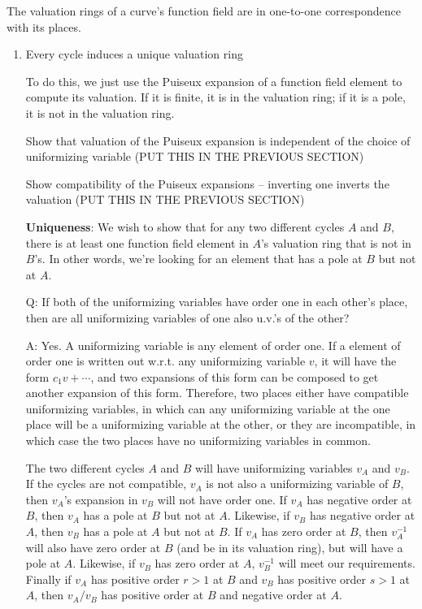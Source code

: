 
\begin{theorem}
The valuation rings of a curve's function field are in one-to-one correspondence with its places.

\proof
\begin{enumerate}
\item Every cycle induces a unique valuation ring

To do this, we just use the Puiseux expansion of a function field element to compute its valuation.
If it is finite, it is in the valuation ring; if it is a pole, it is not in the valuation ring.

Show that valuation of the Puiseux expansion is independent of the choice of uniformizing variable
(PUT THIS IN THE PREVIOUS SECTION)

Show compatibility of the Puiseux expansions -- inverting one inverts the valuation
(PUT THIS IN THE PREVIOUS SECTION)

{\bf Uniqueness}: We wish to show that for any two different cycles $A$ and $B$,
there is at least one function field element in $A$'s valuation ring that is not in $B$'s.
In other words, we're looking for an element that has a pole at $B$ but not at $A$.

Q: If both of the uniformizing variables have order one in each other's place,
then are all uniformizing variables of one also u.v.'s of the other?

A: Yes.  A uniformizing variable is any element of order one.  If a element of
order one is written out w.r.t. any uniformizing variable $v$, it will have
the form $c_1 v + \cdots$, and two expansions of this form can be composed
to get another expansion of this form.  Therefore, two places either have
compatible uniformizing variables, in which can any uniformizing variable
at the one place will be a uniformizing variable at the other, or they
are incompatible, in which case the two places have no uniformizing
variables in common.

The two different cycles $A$ and $B$ will have uniformizing variables $v_A$
and $v_B$.  If the cycles are not compatible,
$v_A$ is not also a uniformizing variable of $B$, then $v_A$'s expansion
in $v_B$ will not have order one.  If $v_A$ has negative order at $B$, then $v_A$ has
a pole at $B$ but not at $A$.  Likewise, if $v_B$ has negative order at $A$, then
$v_B$ has a pole at $A$ but not at $B$.
If $v_A$ has zero order at $B$, then $v_A^{-1}$ will also have zero order
at $B$ (and be in its valuation ring), but will have a pole at $A$.
Likewise, if $v_B$ has zero order at $A$, $v_B^{-1}$ will meet our requirements.
Finally if $v_A$ has positive order $r>1$ at $B$ and $v_B$ has positive order $s>1$ at $A$,
then $v_A/v_B$ has positive order at $B$ and negative order at $A$.


\end{enumerate}
\end{theorem}
